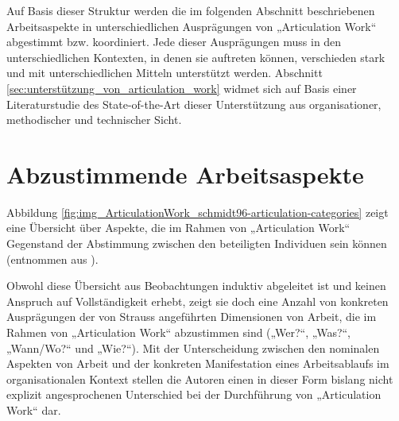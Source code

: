 Auf Basis dieser Struktur werden die im folgenden Abschnitt beschriebenen Arbeitsaspekte in unterschiedlichen Ausprägungen von „Articulation Work“ abgestimmt bzw. koordiniert. Jede dieser Ausprägungen muss in den unterschiedlichen Kontexten, in denen sie auftreten können, verschieden stark und mit unterschiedlichen Mitteln unterstützt werden. Abschnitt \ref{sec:unterstützung_von_articulation_work} widmet sich auf Basis einer Literaturstudie des State-of-the-Art dieser Unterstützung aus organisationer, methodischer und technischer Sicht.


\section{Abzustimmende Arbeitsaspekte} %
\label{sec:abzustimmende_arbeitsaspekte}

Abbildung \ref{fig:img_ArticulationWork_schmidt96-articulation-categories} zeigt eine Übersicht über Aspekte, die im Rahmen von „Articulation Work“ Gegenstand der Abstimmung zwischen den beteiligten Individuen sein können (entnommen aus \citep{Schmidt96}).

Obwohl diese Übersicht aus Beobachtungen induktiv abgeleitet ist und keinen Anspruch auf Vollständigkeit erhebt, zeigt sie doch eine Anzahl von konkreten Ausprägungen der von Strauss angeführten Dimensionen von Arbeit, die im Rahmen von „Articulation Work“ abzustimmen sind („Wer?“, „Was?“, „Wann/Wo?“ und „Wie?“). Mit der Unterscheidung zwischen den nominalen Aspekten von Arbeit und der konkreten Manifestation eines Arbeitsablaufs im organisationalen Kontext stellen die Autoren einen in dieser Form bislang nicht explizit angesprochenen Unterschied bei der Durchführung von „Articulation Work“ dar.

